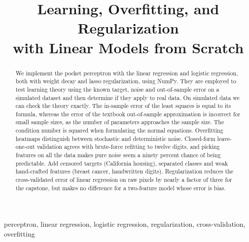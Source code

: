 \documentclass[conference]{IEEEtran}
\begin{document}
\title{Learning, Overfitting, and Regularization\\with Linear Models from Scratch}

\author{
\and
{}
}

\maketitle

\begin{abstract}
We implement the pocket perceptron with the linear regression and logistic regression, both with weight decay and lasso regularization, using NumPy. They are employed to test learning theory using the known target, noise and out-of-sample error on a simulated dataset and then determine if they apply to real data. On simulated data we can check the theory exactly. The in-sample error of the least squares is equal to its formula, whereas the error of the textbook out-of-sample approximation is incorrect for small sample sizes, as the number of parameters approaches the sample size. The condition number is squared when formulating the normal equations. Overfitting heatmaps distinguish between stochastic and deterministic noise. Closed-form leave-one-out validation agrees with brute-force refitting to twelve digits, and picking features on all the data makes pure noise seem a ninety percent chance of being predictable. Add censored targets (California housing), separated classes and weak hand-crafted features (breast cancer, handwritten digits). Regularization reduces the cross-validated error of linear regression on raw pixels by nearly a factor of three for the capstone, but makes no difference for a two-feature model whose error is bias.
\end{abstract}

\begin{IEEEkeywords}
perceptron, linear regression, logistic regression, regularization, cross-validation, overfitting
\end{IEEEkeywords}
\end{document}
